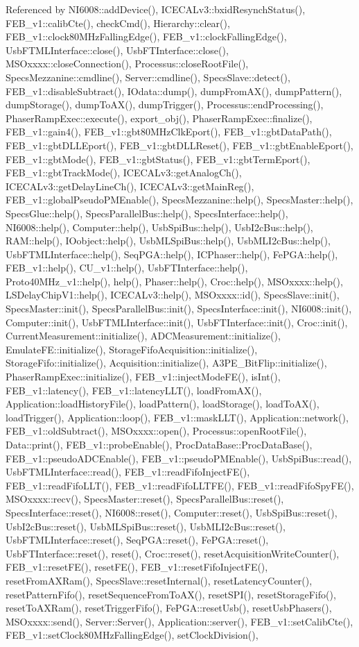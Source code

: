 Referenced by NI6008::addDevice(), ICECALv3::bxidResynchStatus(), FEB\_\-v1::calibCte(), checkCmd(), Hierarchy::clear(), FEB\_\-v1::clock80MHzFallingEdge(), FEB\_\-v1::clockFallingEdge(), UsbFTMLInterface::close(), UsbFTInterface::close(), MSOxxxx::closeConnection(), Processus::closeRootFile(), SpecsMezzanine::cmdline(), Server::cmdline(), SpecsSlave::detect(), FEB\_\-v1::disableSubtract(), IOdata::dump(), dumpFromAX(), dumpPattern(), dumpStorage(), dumpToAX(), dumpTrigger(), Processus::endProcessing(), PhaserRampExec::execute(), export\_\-obj(), PhaserRampExec::finalize(), FEB\_\-v1::gain4(), FEB\_\-v1::gbt80MHzClkEport(), FEB\_\-v1::gbtDataPath(), FEB\_\-v1::gbtDLLEport(), FEB\_\-v1::gbtDLLReset(), FEB\_\-v1::gbtEnableEport(), FEB\_\-v1::gbtMode(), FEB\_\-v1::gbtStatus(), FEB\_\-v1::gbtTermEport(), FEB\_\-v1::gbtTrackMode(), ICECALv3::getAnalogCh(), ICECALv3::getDelayLineCh(), ICECALv3::getMainReg(), FEB\_\-v1::globalPseudoPMEnable(), SpecsMezzanine::help(), SpecsMaster::help(), SpecsGlue::help(), SpecsParallelBus::help(), SpecsInterface::help(), NI6008::help(), Computer::help(), UsbSpiBus::help(), UsbI2cBus::help(), RAM::help(), IOobject::help(), UsbMLSpiBus::help(), UsbMLI2cBus::help(), UsbFTMLInterface::help(), SeqPGA::help(), ICPhaser::help(), FePGA::help(), FEB\_\-v1::help(), CU\_\-v1::help(), UsbFTInterface::help(), Proto40MHz\_\-v1::help(), help(), Phaser::help(), Croc::help(), MSOxxxx::help(), LSDelayChipV1::help(), ICECALv3::help(), MSOxxxx::id(), SpecsSlave::init(), SpecsMaster::init(), SpecsParallelBus::init(), SpecsInterface::init(), NI6008::init(), Computer::init(), UsbFTMLInterface::init(), UsbFTInterface::init(), Croc::init(), CurrentMeasurement::initialize(), ADCMeasurement::initialize(), EmulateFE::initialize(), StorageFifoAcquisition::initialize(), StorageFifo::initialize(), Acquisition::initialize(), A3PE\_\-BitFlip::initialize(), PhaserRampExec::initialize(), FEB\_\-v1::injectModeFE(), isInt(), FEB\_\-v1::latency(), FEB\_\-v1::latencyLLT(), loadFromAX(), Application::loadHistoryFile(), loadPattern(), loadStorage(), loadToAX(), loadTrigger(), Application::loop(), FEB\_\-v1::maskLLT(), Application::network(), FEB\_\-v1::oldSubtract(), MSOxxxx::open(), Processus::openRootFile(), Data::print(), FEB\_\-v1::probeEnable(), ProcDataBase::ProcDataBase(), FEB\_\-v1::pseudoADCEnable(), FEB\_\-v1::pseudoPMEnable(), UsbSpiBus::read(), UsbFTMLInterface::read(), FEB\_\-v1::readFifoInjectFE(), FEB\_\-v1::readFifoLLT(), FEB\_\-v1::readFifoLLTFE(), FEB\_\-v1::readFifoSpyFE(), MSOxxxx::recv(), SpecsMaster::reset(), SpecsParallelBus::reset(), SpecsInterface::reset(), NI6008::reset(), Computer::reset(), UsbSpiBus::reset(), UsbI2cBus::reset(), UsbMLSpiBus::reset(), UsbMLI2cBus::reset(), UsbFTMLInterface::reset(), SeqPGA::reset(), FePGA::reset(), UsbFTInterface::reset(), reset(), Croc::reset(), resetAcquisitionWriteCounter(), FEB\_\-v1::resetFE(), resetFE(), FEB\_\-v1::resetFifoInjectFE(), resetFromAXRam(), SpecsSlave::resetInternal(), resetLatencyCounter(), resetPatternFifo(), resetSequenceFromToAX(), resetSPI(), resetStorageFifo(), resetToAXRam(), resetTriggerFifo(), FePGA::resetUsb(), resetUsbPhasers(), MSOxxxx::send(), Server::Server(), Application::server(), FEB\_\-v1::setCalibCte(), FEB\_\-v1::setClock80MHzFallingEdge(), setClockDivision(), 